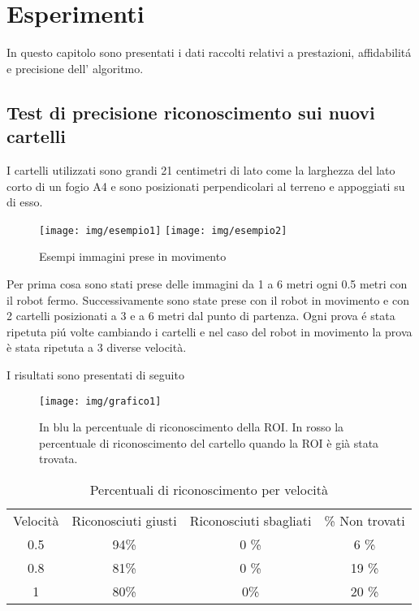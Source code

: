 
\chapter{Esperimenti}
In questo capitolo sono presentati i dati raccolti relativi a prestazioni, affidabilit\'a e precisione dell' algoritmo.

\section{Test di precisione riconoscimento sui nuovi cartelli}
	
	I cartelli utilizzati sono grandi 21 centimetri di lato come la larghezza del lato corto di un fogio A4 e sono posizionati perpendicolari al terreno e appoggiati su di esso.
	\begin{figure}[!ht]
		\centering
		\texttt{[image: img/esempio1]}
		\texttt{[image: img/esempio2]}
		\caption[Esempio immagini prese]{Esempi immagini prese in movimento}
	\end{figure}
	Per prima cosa sono stati prese delle immagini da 1 a 6 metri ogni 0.5 metri con il robot fermo. Successivamente sono state prese con il robot in movimento e con 2 cartelli posizionati a 3 e a 6 metri dal punto di partenza. Ogni prova \'e stata ripetuta pi\'u volte cambiando i cartelli e nel caso del robot in movimento la prova è stata ripetuta a 3 diverse velocità.

	I risultati sono presentati di seguito

	\begin{figure}[!ht]
		\centering
		\texttt{[image: img/grafico1]}
		\caption[Grafico precisione riconoscimento]{In blu la percentuale di riconoscimento della ROI. In rosso la percentuale di riconoscimento del cartello quando la ROI è già stata trovata.}
	\end{figure}

	\begin{table}[h]
		\centering
		\begin{tabular}{cccc}
		    Velocità & Riconosciuti giusti & Riconosciuti sbagliati & \% Non trovati \\
			0.5 &   94\%    & 0 \%		& 6 \%    	\\
			0.8 &   81\%    & 0 \%		& 19 \%		\\
			1 	& 	80\%	& 0\%		& 20 \%		\\
		\end{tabular}
		\caption{Percentuali di riconoscimento per velocità}
	\end{table}

